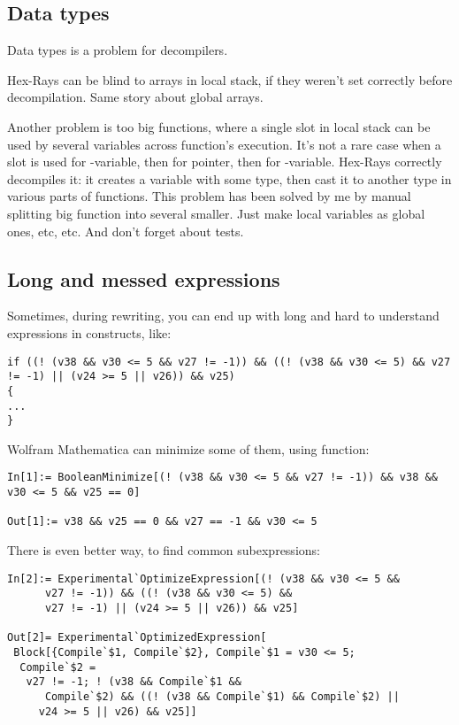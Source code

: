 \subsection{Data types}

Data types is a problem for decompilers.

Hex-Rays can be blind to arrays in local stack, if they weren't set correctly before decompilation.
Same story about global arrays.

Another problem is too big functions, where a single slot in local stack can be used by several variables
across function's execution.
It's not a rare case when a slot is used for -variable, then for pointer, then for -variable.
Hex-Rays correctly decompiles it: it creates a variable with some type, then cast it to another type in various
parts of functions.
This problem has been solved by me by manual splitting big function into several smaller.
Just make local variables as global ones, etc, etc.
And don't forget about tests.

\subsection{Long and messed expressions}

Sometimes, during rewriting, you can end up with long and hard to understand expressions in  constructs, like:

\begin{lstlisting}
if ((! (v38 && v30 <= 5 && v27 != -1)) && ((! (v38 && v30 <= 5) && v27 != -1) || (v24 >= 5 || v26)) && v25)
{
...
}
\end{lstlisting}

Wolfram Mathematica can minimize some of them, using  function:

\begin{lstlisting}
In[1]:= BooleanMinimize[(! (v38 && v30 <= 5 && v27 != -1)) && v38 && v30 <= 5 && v25 == 0]

Out[1]:= v38 && v25 == 0 && v27 == -1 && v30 <= 5
\end{lstlisting}

There is even better way, to find common subexpressions:

\begin{lstlisting}
In[2]:= Experimental`OptimizeExpression[(! (v38 && v30 <= 5 && 
      v27 != -1)) && ((! (v38 && v30 <= 5) && 
      v27 != -1) || (v24 >= 5 || v26)) && v25]

Out[2]= Experimental`OptimizedExpression[
 Block[{Compile`$1, Compile`$2}, Compile`$1 = v30 <= 5; 
  Compile`$2 = 
   v27 != -1; ! (v38 && Compile`$1 && 
      Compile`$2) && ((! (v38 && Compile`$1) && Compile`$2) || 
     v24 >= 5 || v26) && v25]]
\end{lstlisting}

